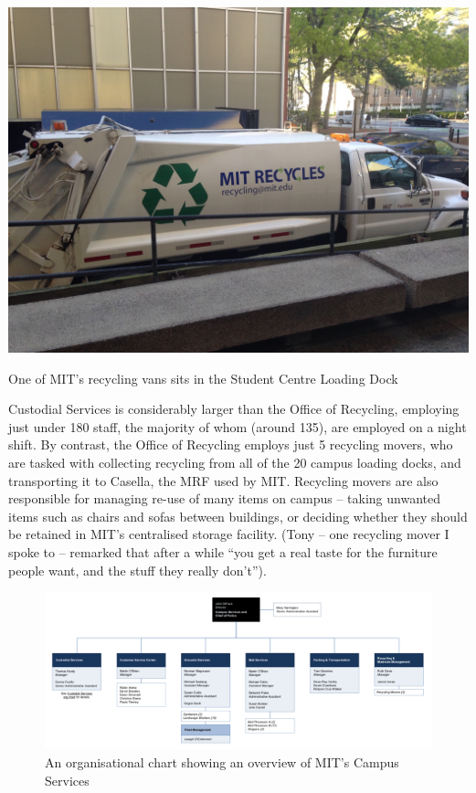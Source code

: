 \documentclass[nofonts,nols,justified,nobib]{tufte-book}
\begin{document}
\begin{marginfigure}
\includegraphics[width=\textwidth]{img/2/mit-van.JPG}
\caption{One of MIT's recycling vans sits in the Student Centre Loading Dock}
\end{marginfigure}


Custodial Services is considerably larger than the Office of Recycling, employing just under 180 staff, the majority of whom (around 135), are employed on a night shift. By contrast, the Office of Recycling employs just 5 recycling movers, who are tasked with collecting recycling from all of the 20 campus loading docks, and transporting it to Casella, the MRF used by MIT. Recycling movers are also responsible for managing re-use of many items on campus -- taking unwanted items such as chairs and sofas between buildings, or deciding whether they should be retained in MIT's centralised storage facility. (Tony -- one recycling mover I spoke to -- remarked that after a while ``you get a real taste for the furniture people want, and the stuff they really don't'').

\begin{figure}
 \includegraphics[width=1\linewidth]{img/2/campus-services-overview.png}
    \caption{An organisational chart showing an overview of MIT's Campus Services}
\end{figure}
\end{document}

